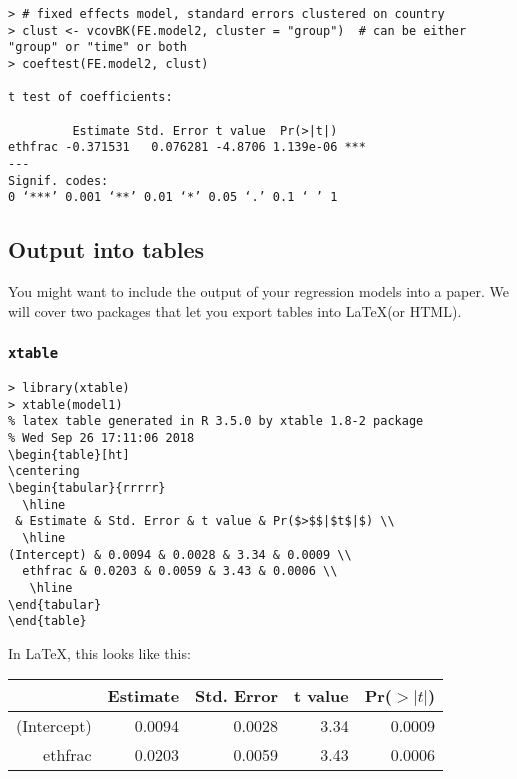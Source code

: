 \begin{lstlisting}
> # fixed effects model, standard errors clustered on country
> clust <- vcovBK(FE.model2, cluster = "group")  # can be either "group" or "time" or both
> coeftest(FE.model2, clust)

t test of coefficients:

         Estimate Std. Error t value  Pr(>|t|)    
ethfrac -0.371531   0.076281 -4.8706 1.139e-06 ***
---
Signif. codes:  
0 ‘***’ 0.001 ‘**’ 0.01 ‘*’ 0.05 ‘.’ 0.1 ‘ ’ 1

\end{lstlisting}

\subsection{Output into tables}

You might want to include the output of your regression models into a paper. We will cover two packages that let you export tables into \LaTeX (or HTML).

\subsubsection*{\texttt{xtable}}

\begin{lstlisting}
> library(xtable)
> xtable(model1)
% latex table generated in R 3.5.0 by xtable 1.8-2 package
% Wed Sep 26 17:11:06 2018
\begin{table}[ht]
\centering
\begin{tabular}{rrrrr}
  \hline
 & Estimate & Std. Error & t value & Pr($>$$|$t$|$) \\ 
  \hline
(Intercept) & 0.0094 & 0.0028 & 3.34 & 0.0009 \\ 
  ethfrac & 0.0203 & 0.0059 & 3.43 & 0.0006 \\ 
   \hline
\end{tabular}
\end{table}
\end{lstlisting}

In \LaTeX, this looks like this:

\begin{table}[h]
\centering
\begin{tabular}{rrrrr}
  \hline
 & Estimate & Std. Error & t value & Pr($>|t|$) \\ 
  \hline
(Intercept) & 0.0094 & 0.0028 & 3.34 & 0.0009 \\ 
  ethfrac & 0.0203 & 0.0059 & 3.43 & 0.0006 \\ 
   \hline
\end{tabular}
\end{table}

